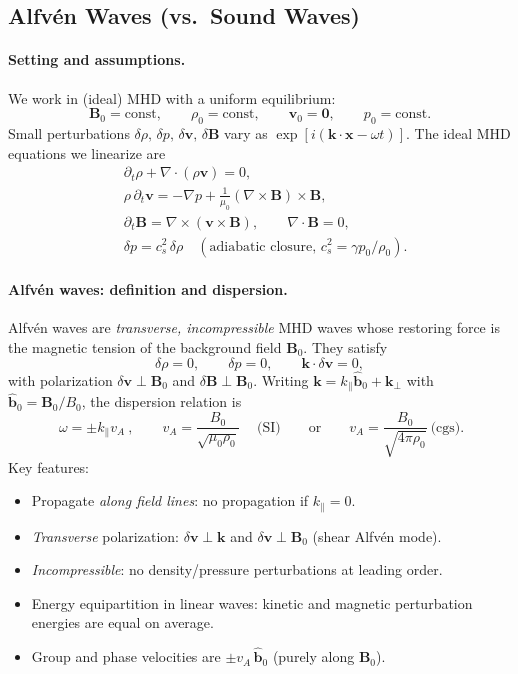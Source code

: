 \subsection{Alfv\'en Waves (vs.\ Sound Waves)}

\paragraph{Setting and assumptions.}
We work in (ideal) MHD with a uniform equilibrium:
\[
\mathbf{B}_0=\text{const},\qquad \rho_0=\text{const},\qquad \mathbf{v}_0=\mathbf{0},\qquad p_0=\text{const}.
\]
Small perturbations $\delta \rho,\,\delta p,\,\delta \mathbf{v},\,\delta \mathbf{B}$ vary as $\exp[i(\mathbf{k}\!\cdot\!\mathbf{x}-\omega t)]$.
The ideal MHD equations we linearize are
\[
\begin{aligned}
&\partial_t \rho + \nabla\!\cdot(\rho \mathbf{v}) = 0,\\
&\rho\,\partial_t \mathbf{v} = -\nabla p + \frac{1}{\mu_0}(\nabla\times \mathbf{B})\times \mathbf{B},\\
&\partial_t \mathbf{B} = \nabla\times(\mathbf{v}\times \mathbf{B}),\qquad \nabla\!\cdot\!\mathbf{B}=0,\\
&\delta p = c_s^2\,\delta \rho\quad(\text{adiabatic closure, }c_s^2=\gamma p_0/\rho_0).
\end{aligned}
\]

\paragraph{Alfv\'en waves: definition and dispersion.}
Alfv\'en waves are \emph{transverse, incompressible} MHD waves whose restoring force is the magnetic tension of the background field $\mathbf{B}_0$.
They satisfy
\[
\delta \rho = 0,\qquad \delta p = 0,\qquad \mathbf{k}\cdot \delta\mathbf{v}=0,
\]
with polarization $\delta\mathbf{v}\perp\mathbf{B}_0$ and $\delta\mathbf{B}\perp\mathbf{B}_0$.
Writing $\mathbf{k}=k_\parallel \hat{\mathbf{b}}_0 + \mathbf{k}_\perp$ with $\hat{\mathbf{b}}_0=\mathbf{B}_0/B_0$, the dispersion relation is
\[
\boxed{\ \omega = \pm k_\parallel v_A\ ,\qquad v_A=\frac{B_0}{\sqrt{\mu_0 \rho_0}}\ } \quad
\text{(SI)}\qquad\text{or}\qquad v_A=\frac{B_0}{\sqrt{4\pi \rho_0}}\ \text{(cgs)}.
\]
Key features:
\begin{itemize}
\item Propagate \emph{along field lines}: no propagation if $k_\parallel=0$.
\item \emph{Transverse} polarization: $\delta\mathbf{v}\perp \mathbf{k}$ and $\delta\mathbf{v}\perp \mathbf{B}_0$ (shear Alfv\'en mode).
\item \emph{Incompressible}: no density/pressure perturbations at leading order.
\item Energy equipartition in linear waves: kinetic and magnetic perturbation energies are equal on average.
\item Group and phase velocities are $\pm v_A\,\hat{\mathbf{b}}_0$ (purely along $\mathbf{B}_0$).
\end{itemize}

